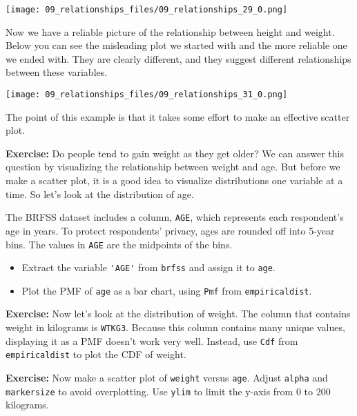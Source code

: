 \begin{center}
\texttt{[image: 09\_relationships\_files/09\_relationships\_29\_0.png]}
\end{center}

Now we have a reliable picture of the relationship between height and
weight. Below you can see the misleading plot we started with and the
more reliable one we ended with. They are clearly different, and they
suggest different relationships between these variables.



\begin{center}
\texttt{[image: 09\_relationships\_files/09\_relationships\_31\_0.png]}
\end{center}

The point of this example is that it takes some effort to make an
effective scatter plot.

\textbf{Exercise:} Do people tend to gain weight as they get older? We
can answer this question by visualizing the relationship between weight
and age. But before we make a scatter plot, it is a good idea to
visualize distributions one variable at a time. So let's look at the
distribution of age.

The BRFSS dataset includes a column, \passthrough{\lstinline!AGE!},
which represents each respondent's age in years. To protect respondents'
privacy, ages are rounded off into 5-year bins. The values in
\passthrough{\lstinline!AGE!} are the midpoints of the bins.

\begin{itemize}
\item
  Extract the variable \passthrough{\lstinline!'AGE'!} from
  \passthrough{\lstinline!brfss!} and assign it to
  \passthrough{\lstinline!age!}.
\item
  Plot the PMF of \passthrough{\lstinline!age!} as a bar chart, using
  \passthrough{\lstinline!Pmf!} from
  \passthrough{\lstinline!empiricaldist!}.
\end{itemize}

\textbf{Exercise:} Now let's look at the distribution of weight. The
column that contains weight in kilograms is
\passthrough{\lstinline!WTKG3!}. Because this column contains many
unique values, displaying it as a PMF doesn't work very well. Instead,
use \passthrough{\lstinline!Cdf!} from
\passthrough{\lstinline!empiricaldist!} to plot the CDF of weight.

\textbf{Exercise:} Now make a scatter plot of
\passthrough{\lstinline!weight!} versus \passthrough{\lstinline!age!}.
Adjust \passthrough{\lstinline!alpha!} and
\passthrough{\lstinline!markersize!} to avoid overplotting. Use
\passthrough{\lstinline!ylim!} to limit the y-axis from 0 to 200
kilograms.

